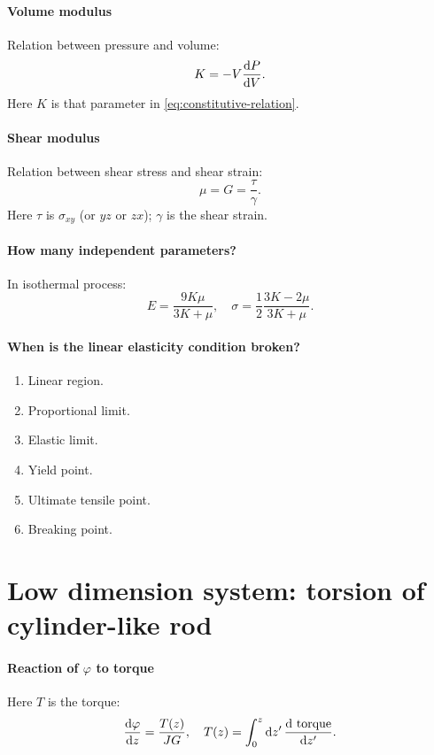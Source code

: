 \documentclass[hyperref, a4paper]{article}
\begin{document}
\paragraph*{Volume modulus} Relation between pressure and volume:
\begin{equation}
    K = - V \dv{P}{V}. 
\end{equation}
Here $K$ is that parameter in \eqref{eq:constitutive-relation}.

\paragraph*{Shear modulus} Relation between shear stress and shear strain:
\begin{equation}
    \mu = G = \frac{\tau}{\gamma}.
\end{equation}
Here $\tau$ is $\sigma_{xy}$ (or $yz$ or $zx$); $\gamma$ is the shear strain.


\paragraph*{How many independent parameters?} In isothermal process:  
\begin{equation}
    E = \frac{9 K \mu}{3 K + \mu}, \quad 
    \sigma = \frac{1}{2} \frac{3K - 2 \mu}{3 K + \mu}.
\end{equation}

\paragraph*{When is the linear elasticity condition broken?} 
\begin{enumerate}
    \item Linear region.
    \item Proportional limit.
    \item Elastic limit.
    \item Yield point.
    \item Ultimate tensile point.
    \item Breaking point.
\end{enumerate}


\section{Low dimension system: torsion of cylinder-like rod} 

\paragraph*{Reaction of $\varphi$ to torque} Here $T$ is the torque:
\begin{equation}
    \dv{\varphi}{z} = \frac{T(z)}{JG}, \quad 
    T(z) = \int_{0}^{z} \dd{z'} \dv{\ \mathrm{torque}}{z'}.
\end{equation}
\end{document}
